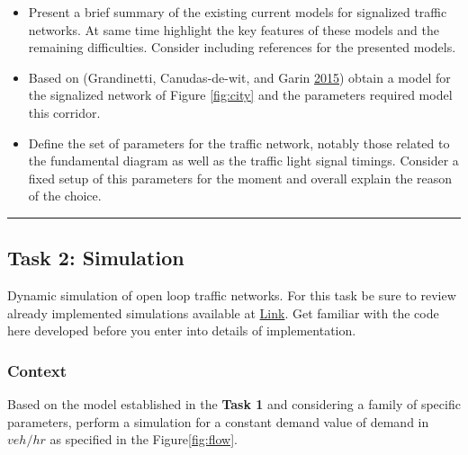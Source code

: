 \documentclass[]{book}
\theoremstyle{definition}
\theoremstyle{definition}
\theoremstyle{definition}
\theoremstyle{remark}
\begin{document}
\begin{itemize}
\item
  Present a brief summary of the existing current models for signalized
  traffic networks. At same time highlight the key features of these
  models and the remaining difficulties. Consider including references
  for the presented models.
\item
  Based on (Grandinetti, Canudas-de-wit, and Garin
  \protect\hyperlink{ref-Grandinetti2015}{2015}) obtain a model for the
  signalized network of Figure \ref{fig:city} and the parameters
  required model this corridor.
\item
  Define the set of parameters for the traffic network, notably those
  related to the fundamental diagram as well as the traffic light signal
  timings. Consider a fixed setup of this parameters for the moment and
  overall explain the reason of the choice.
\end{itemize}

\begin{center}\rule{0.5\linewidth}{\linethickness}\end{center}

\hypertarget{task-2-simulation}{%
\subsection*{Task 2: Simulation}\label{task-2-simulation}}

Dynamic simulation of open loop traffic networks. For this task be sure
to review already implemented simulations available at
\href{https://github.com/andres-ladino-ifsttar/traffic-macrosimulator}{Link}.
Get familiar with the code here developed before you enter into details
of implementation.

\hypertarget{context-2}{%
\subsubsection*{Context}\label{context-2}}

Based on the model established in the \textbf{Task 1} and considering a
family of specific parameters, perform a simulation for a constant
demand value of demand in \(veh/hr\) as specified in the
Figure\ref{fig:flow}.
\end{document}
